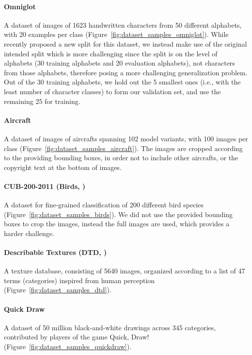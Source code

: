 \documentclass{article} \usepackage{iclr2020_conference,times}
\begin{document}
\paragraph{Omniglot \citep{lake2015human}} A dataset of images of 1623
handwritten characters from 50 different alphabets, with 20 examples per class
(Figure~\ref{fig:dataset_samples_omniglot}). While recently \cite{vinyals2016matching}
proposed a new split for this dataset, we instead make use of the original
intended split \cite{lake2015human} which is more challenging since the split
is on the level of alphabets (30 training alphabets and 20 evaluation
alphabets), not characters from those alphabets, therefore posing a more
challenging generalization problem. Out of the 30 training alphabets, we hold
out the 5 smallest ones (i.e., with the least number of character classes) to
form our validation set, and use the remaining 25 for training.

\paragraph{Aircraft \citep{maji13finegrained}} A dataset of images of aircrafts
spanning 102 model variants, with 100 images per class
(Figure~\ref{fig:dataset_samples_aircraft}).
The images are cropped according to the providing bounding boxes, in order not
to include other aircrafts, or the copyright text at the bottom of images.

\paragraph{CUB-200-2011 (Birds, \citealp{WahCUB_200_2011})} A dataset for
fine-grained classification of 200 different bird species
(Figure~\ref{fig:dataset_samples_birds}).
We did not use the provided bounding boxes to crop the images, instead the full
images are used, which provides a harder challenge.

\paragraph{Describable Textures (DTD, \citealp{cimpoi14describing})} A texture
database, consisting of 5640 images, organized according to a list of 47 terms
(categories) inspired from human perception
(Figure~\ref{fig:dataset_samples_dtd}).

\paragraph{Quick Draw \citep{jongejan2016quick}} A dataset of 50 million
black-and-white drawings across 345 categories, contributed by players of the
game Quick, Draw!  (Figure~\ref{fig:dataset_samples_quickdraw}).
\end{document}
